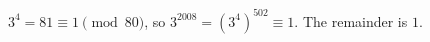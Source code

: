 $3^4=81\equiv1\pmod{80}$, so $3^{2008}=\left(3^4\right)^{502}\equiv1$. The remainder is $\boxed{1}$.
